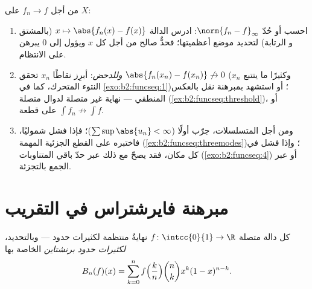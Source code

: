 \begin{method}\label{met:b2:funcseq:uniform}
من أجل $f_n \to f$  على $X$:
\begin{enumerate}
  \item احسب أو حُدّ $\norm{f_n - f}_\infty$: ادرس
        الدالة $x \mapsto \abs{f_n(x) - f(x)}$ (بالمشتق و
        الرتابة) لتحديد موضع أعظميتها؛ فحدٌّ صالح من أجل
        كل $x$ ويؤول إلى $0$ يبرهن على الانتظام.
  \item \emph{وللدحض}: أبرِز نقاطًا $x_n$ تحقق
        $\abs{f_n(x_n) - f(x_n)} \not\to 0$ (وكثيرًا ما يتتبع $x_n$
        النتوء المتحرك، كما في \cref{exo:b2:funcseq:1})؛ أو
        استشهد بمبرهنة نقل بالعكس المنطقي --- نهاية غير
        متصلة لدوال متصلة
        (\cref{ex:b2:funcseq:threshold})، أو $\int f_n
        \not\to \int f$ على قطعة.
  \item ومن أجل المتسلسلات، جرّب  أولًا
        ($\sum\sup\abs{u_n} < \infty$)؛ فإذا فشل شموليًا،
        فاختبره على القطع الجزئية المهمة
        (\cref{ex:b2:funcseq:threemodes})؛ وإذا فشل
        في كل مكان، فقد يصحّ  مع ذلك عبر
        حدّ باقي المتناوبات
        (\cref{exo:b2:funcseq:4}) أو عبر الجمع بالتجزئة.
\end{enumerate}
\end{method}

\section{مبرهنة فايرشتراس في التقريب}

\begin{theorem}\label{thm:b2:funcseq:weierstrass}
كل دالة متصلة $f \colon \intcc{0}{1} \to \R$ نهايةٌ منتظمة
لكثيرات حدود --- وبالتحديد، \emph{لكثيرات حدود
برنشتاين} الخاصة بها
\[
B_n(f)(x) = \sum_{k=0}^{n} f\Bigl(\frac kn\Bigr)\binom nk x^k
(1-x)^{n-k} .
\]
\end{theorem}

